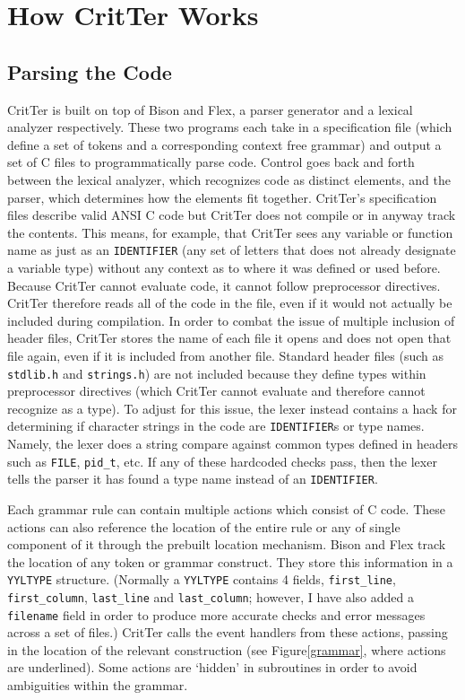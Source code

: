 \documentclass[12pt]{report}
\def\lstlistingname{Figure}
\newcommand{\refCode}{\lstlistingname \hspace{1mm}}
\newcommand{\programName}{CritTer\xspace}
\begin{document}
\chapter{How \programName Works}

\section{Parsing the Code}

\programName is built on top of Bison and Flex, a parser generator and a lexical analyzer 
respectively. These two programs each take in a specification file (which define a set of tokens and a 
corresponding context free grammar) and output a set of C files to programmatically parse code. 
Control goes back and forth between the lexical analyzer, which recognizes code as distinct elements, 
and the parser, which determines how the elements fit together. \programName's specification files 
describe valid ANSI C code but \programName does not compile or in anyway track the contents. This 
means, for example, that \programName sees any variable or function name as just as an 
\lstinline{IDENTIFIER} (any set of letters that does not already designate a variable type) without any 
context as to where it was defined or used before. Because \programName cannot evaluate code, it 
cannot follow preprocessor directives. \programName therefore reads all of the code in the file, even if 
it would not actually be included during compilation. In order to combat the issue of multiple inclusion 
of header files, \programName stores the name of each file it opens and does not open that file again, 
even if it is included from another file. Standard header files (such as \lstinline{stdlib.h} and 
\lstinline{strings.h}) are not included because they define types within preprocessor directives (which 
\programName cannot evaluate and therefore cannot recognize as a type). To adjust for this issue, the 
lexer instead contains a hack for determining if character strings in the code are \lstinline{IDENTIFIER}s 
or type names. Namely, the lexer does a string compare against common types defined in headers 
such as \lstinline{FILE}, \lstinline{pid_t}, etc. If any of these hardcoded checks pass, then the lexer tells 
the parser it has found a type name instead of an \lstinline{IDENTIFIER}.

Each grammar rule can contain multiple actions which consist of C code. These actions can 
also reference the location of the entire rule or any of single component of it through the prebuilt 
location mechanism. Bison and Flex track the location of any token or grammar construct. They store 
this information in a \lstinline{YYLTYPE} structure. (Normally a \lstinline{YYLTYPE} contains 4 fields, 
\lstinline{first_line}, \lstinline{first_column}, \lstinline{last_line} and \lstinline{last_column}; however, I 
have also added a \lstinline{filename} field in order to produce more accurate checks and error 
messages across a set of files.) \programName calls the event handlers from these actions, passing in 
the location of the relevant construction (see \refCode \ref{grammar}, where actions are underlined). 
Some actions are `hidden' in subroutines in order to avoid ambiguities within the grammar.
\end{document}
